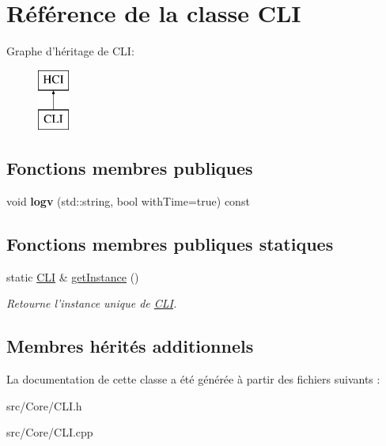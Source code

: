 \hypertarget{classCLI}{\section{Référence de la classe C\-L\-I}
\label{classCLI}
}
Graphe d'héritage de C\-L\-I\-:\begin{figure}[H]
\begin{center}
\leavevmode
\includegraphics[height=2.000000cm]{classCLI}
\end{center}
\end{figure}
\subsection*{Fonctions membres publiques}
\begin{DoxyCompactItemize}
\item 
\hypertarget{classCLI_a43ec846cf90e311e7867d4315d4e559c}{void {\bfseries logv} (std\-::string, bool with\-Time=true) const }\label{classCLI_a43ec846cf90e311e7867d4315d4e559c}

\end{DoxyCompactItemize}
\subsection*{Fonctions membres publiques statiques}
\begin{DoxyCompactItemize}
\item 
\hypertarget{classCLI_afb0099de9473ff74480fa40cec78a3ac}{static \hyperlink{classCLI}{C\-L\-I} \& \hyperlink{classCLI_afb0099de9473ff74480fa40cec78a3ac}{get\-Instance} ()}\label{classCLI_afb0099de9473ff74480fa40cec78a3ac}

\begin{DoxyCompactList}\small\item\em Retourne l'instance unique de \hyperlink{classCLI}{C\-L\-I}. \end{DoxyCompactList}\end{DoxyCompactItemize}
\subsection*{Membres hérités additionnels}


La documentation de cette classe a été générée à partir des fichiers suivants \-:\begin{DoxyCompactItemize}
\item 
src/\-Core/C\-L\-I.\-h\item 
src/\-Core/C\-L\-I.\-cpp\end{DoxyCompactItemize}
